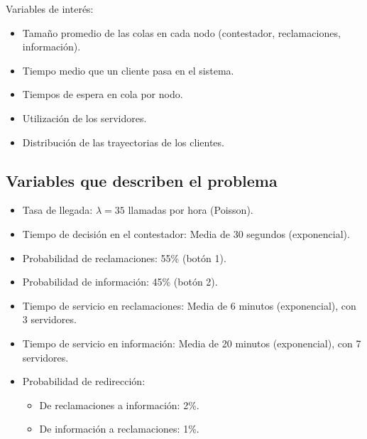\documentclass[12pt]{article}
\begin{document}
Variables de interés:
\begin{itemize}
    \item Tamaño promedio de las colas en cada nodo (contestador, reclamaciones, información).
    \item Tiempo medio que un cliente pasa en el sistema.
    \item Tiempos de espera en cola por nodo.
    \item Utilización de los servidores.
    \item Distribución de las trayectorias de los clientes.
\end{itemize}

\subsection{Variables que describen el problema}
\begin{itemize}
    \item Tasa de llegada: $\lambda = 35$ llamadas por hora (Poisson).
    \item Tiempo de decisión en el contestador: Media de 30 segundos (exponencial).
    \item Probabilidad de reclamaciones: 55\% (botón 1).
    \item Probabilidad de información: 45\% (botón 2).
    \item Tiempo de servicio en reclamaciones: Media de 6 minutos (exponencial), con 3 servidores.
    \item Tiempo de servicio en información: Media de 20 minutos (exponencial), con 7 servidores.
    \item Probabilidad de redirección:
    \begin{itemize}
        \item De reclamaciones a información: 2\%.
        \item De información a reclamaciones: 1\%.
    \end{itemize}
\end{itemize}
\end{document}
